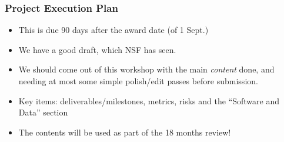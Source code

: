 \begin{frame}
\frametitle{Project Execution Plan}

\begin{itemize}
\item This is due 90 days after the award date (of 1 Sept.)
\item We have a good draft, which NSF has seen. 
\item We should come out of this workshop with the main {\em content} done, and needing at most some simple polish/edit passes before submission.
\item Key items: deliverables/milestones, metrics, risks and the ``Software and Data'' section
\item The contents will be used as part of the 18 months review!
\end{itemize}

\end{frame}


